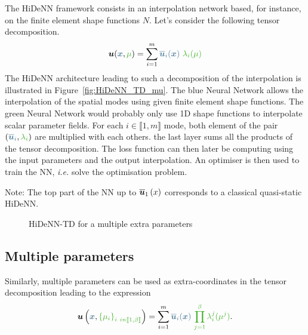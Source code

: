 \documentclass{article}
\begin{document}
The HiDeNN framework consists in an interpolation network based, for instance, on the finite element shape functions $N$. Let's consider the following tensor decomposition.
\begin{equation}
    \vect{u}(\textcolor{BleuLMS!70}{\vect{x}},\textcolor{LGreenLMS}{\mu}) = \sum\limits_{i=1}^m \textcolor{BleuLMS!70}{\overline{\vect{u}}_i(\vect{x})} ~\textcolor{LGreenLMS}{\lambda_i(\mu)}
\end{equation}
The HiDeNN architecture leading to such a decomposition of the interpolation is illustrated in Figure~\ref{fig:HiDeNN_TD_mu}. The \textcolor{BleuLMS!70}{blue Neural Network} allows the interpolation of the spatial modes using given finite element shape functions. The \textcolor{LGreenLMS}{green Neural Network} would probably only use 1D shape functions to interpolate scalar parameter fields. For each $i \in \llbracket 1, m \rrbracket$ mode, both element of the pair $\left(\textcolor{BleuLMS!70}{\vect{\overline{u}}_i}, \textcolor{LGreenLMS}{\lambda_i} \right)$ are multiplied with each others. the last layer sums all the products of the tensor decomposition. 
The loss function can then later be computing using the input parameters and the output interpolation. An optimiser is then used to train the NN, \emph{i.e.} solve the optimisation problem. 

Note: The top part of the NN up to $\boldsymbol{\overline{u}}_1\left(x\right)$ corresponds to a classical quasi-static HiDeNN. 


\newpage
\begin{wrapfigure}{r}{0.47\textwidth}
    \flushleft
    
    \caption{HiDeNN-TD for a multiple extra parameters}
    \label{fig:HiDeNN_TD_multipleMu}
\end{wrapfigure}
\subsection{Multiple parameters}

Similarly, multiple parameters can be used as extra-coordinates in the tensor decomposition leading to the expression 
    \begin{equation}
        \vect{u}\left(\textcolor{BleuLMS!70}{\vect{x}}, \textcolor{LGreenLMS}{\left\{\mu_i\right\}_{i \ in \llbracket 1, \beta \rrbracket}}\right) = \sum\limits_{i=1}^m \textcolor{BleuLMS!70}{\overline{\vect{u}}_i(\vect{x})} ~\textcolor{LGreenLMS}{\prod_{j=1}^{\beta}\lambda_i^j(\mu^j)}.
    \end{equation}
\end{document}
